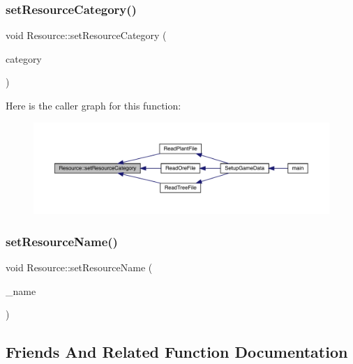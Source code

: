 \subsubsection{\texorpdfstring{set\+Resource\+Category()}{setResourceCategory()}}
{\footnotesize\ttfamily void Resource\+::set\+Resource\+Category (\begin{DoxyParamCaption}\item[{\mbox{\hyperlink{_resource_8hpp_abde177ff256dcb25ea4a492ad7335b82}{En\+Resource\+Category}}}]{category }\end{DoxyParamCaption})}

Here is the caller graph for this function\+:
\nopagebreak
\begin{figure}[H]
\begin{center}
\leavevmode
\includegraphics[width=350pt]{class_resource_adc6d68e48afd6949da3211ed2668ddbd_icgraph}
\end{center}
\end{figure}
\mbox{\label{class_resource_a651a4afa0312b61b86ca0255c9bc64d0}} 
\subsubsection{\texorpdfstring{set\+Resource\+Name()}{setResourceName()}}
{\footnotesize\ttfamily void Resource\+::set\+Resource\+Name (\begin{DoxyParamCaption}\item[{std\+::string}]{\+\_\+name }\end{DoxyParamCaption})}



\subsection{Friends And Related Function Documentation}
\mbox{\label{class_resource_aa5280b133aff1f25ff03e4e4835c2a83}} 
